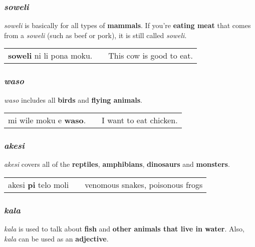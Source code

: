 \subsubsection*{\textit{soweli}}
%
\textit{soweli} is basically for all types of \textbf{mammals}. 
If you're \textbf{eating meat} that comes from a \textit{soweli} (such as beef or pork), it is still called \textit{soweli}. 

\begin{supertabular}{p{5,5cm}|ll}
\textbf{soweli} ni li pona moku. && This cow is good to eat. \\
\end{supertabular} 
%
\subsubsection*{\textit{waso}}
%
\textit{waso} includes all \textbf{birds} and \textbf{flying animals}. 

\begin{supertabular}{p{5,5cm}|ll}
mi wile moku e \textbf{waso}. && I want to eat chicken. \\
\end{supertabular} 
%
%
\subsubsection*{\textit{akesi}}
%
\textit{akesi} covers all of the \textbf{reptiles}, \textbf{amphibians}, \textbf{dinosaurs} and \textbf{monsters}.

\begin{supertabular}{p{5,5cm}|ll}
akesi \textbf{pi} telo moli && venomous snakes, poisonous frogs \\
\end{supertabular} 
%
\subsubsection*{\textit{kala}}
%
\textit{kala} is used to talk about \textbf{fish} and \textbf{other animals that live in water}. 
Also, \textit{kala} can be used as an \textbf{adjective}. 

